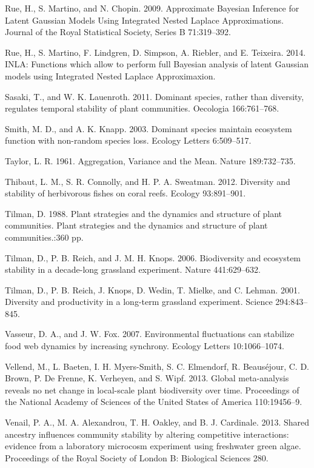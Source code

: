 \documentclass[12pt,]{article}
\begin{document}
Rue, H., S. Martino, and N. Chopin. 2009. Approximate Bayesian Inference
for Latent Gaussian Models Using Integrated Nested Laplace
Approximations. Journal of the Royal Statistical Society, Series B
71:319--392.

Rue, H., S. Martino, F. Lindgren, D. Simpson, A. Riebler, and E.
Teixeira. 2014. INLA: Functions which allow to perform full Bayesian
analysis of latent Gaussian models using Integrated Nested Laplace
Approximaxion.

Sasaki, T., and W. K. Lauenroth. 2011. Dominant species, rather than
diversity, regulates temporal stability of plant communities. Oecologia
166:761--768.

Smith, M. D., and A. K. Knapp. 2003. Dominant species maintain ecosystem
function with non-random species loss. Ecology Letters 6:509--517.

Taylor, L. R. 1961. Aggregation, Variance and the Mean. Nature
189:732--735.

Thibaut, L. M., S. R. Connolly, and H. P. A. Sweatman. 2012. Diversity
and stability of herbivorous fishes on coral reefs. Ecology 93:891--901.

Tilman, D. 1988. Plant strategies and the dynamics and structure of
plant communities. Plant strategies and the dynamics and structure of
plant communities.:360 pp.

Tilman, D., P. B. Reich, and J. M. H. Knops. 2006. Biodiversity and
ecosystem stability in a decade-long grassland experiment. Nature
441:629--632.

Tilman, D., P. B. Reich, J. Knops, D. Wedin, T. Mielke, and C. Lehman.
2001. Diversity and productivity in a long-term grassland experiment.
Science 294:843--845.

Vasseur, D. A., and J. W. Fox. 2007. Environmental fluctuations can
stabilize food web dynamics by increasing synchrony. Ecology Letters
10:1066--1074.

Vellend, M., L. Baeten, I. H. Myers-Smith, S. C. Elmendorf, R.
Beaus{é}jour, C. D. Brown, P. {De Frenne}, K. Verheyen, and S. Wipf.
2013. Global meta-analysis reveals no net change in local-scale plant
biodiversity over time. Proceedings of the National Academy of Sciences
of the United States of America 110:19456--9.

Venail, P. A., M. A. Alexandrou, T. H. Oakley, and B. J. Cardinale.
2013. Shared ancestry influences community stability by altering
competitive interactions: evidence from a laboratory microcosm
experiment using freshwater green algae. Proceedings of the Royal
Society of London B: Biological Sciences 280.
\end{document}

